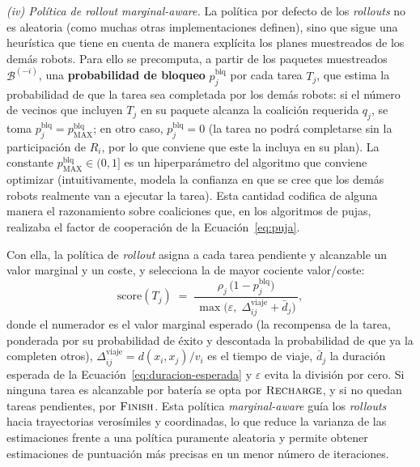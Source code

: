 \smallskip
\emph{(iv) Política de rollout \textit{marginal-aware}.}
La política por defecto de los \textit{rollouts} no es aleatoria (como muchas otras implementaciones definen), sino que sigue una heurística que tiene en cuenta de manera explícita los planes muestreados de los demás robots. Para ello se precomputa, a partir de los paquetes muestreados $\mathcal{B}^{(-i)}$, una \textbf{probabilidad de bloqueo} $p^{\mathrm{blq}}_j$ por cada tarea $T_j$, que estima la probabilidad de que la tarea sea completada por los demás robots: si el número de vecinos que incluyen $T_j$ en su paquete alcanza la coalición requerida $q_j$, se toma $p^{\mathrm{blq}}_j= p^{\mathrm{blq}}_{\mathrm{MAX}}$; en otro caso, $p^{\mathrm{blq}}_j=0$ (la tarea no podrá completarse sin la participación de $R_i$, por lo que conviene que este la incluya en su plan). La constante $p^{\mathrm{blq}}_{\mathrm{MAX}} \in (0,1]$ es un hiperparámetro del algoritmo que conviene optimizar (intuitivamente, modela la confianza en que se cree que los demás robots realmente van a ejecutar la tarea). Esta cantidad codifica de alguna manera el razonamiento sobre coaliciones que, en los algoritmos de pujas, realizaba el factor de cooperación de la Ecuación~\eqref{eq:puja}.

Con ella, la política de \textit{rollout} asigna a cada tarea pendiente y alcanzable un valor marginal y un coste, y selecciona la de mayor cociente valor/coste:
\begin{equation} \label{eq:rollout-score}
    \mathrm{score}(T_j) \;=\; \frac{\,\rho_j\,\bigl(1-p^{\mathrm{blq}}_j\bigr)\,}{\,\max\bigl(\varepsilon,\;\Delta^{\mathrm{viaje}}_{ij}+\bar{d}_j\bigr)\,},
\end{equation}
donde el numerador es el valor marginal esperado (la recompensa de la tarea, ponderada por su probabilidad de éxito y descontada la probabilidad de que ya la completen otros), $\Delta^{\mathrm{viaje}}_{ij}=d(x_i,x_j)/v_i$ es el tiempo de viaje, $\bar{d}_j$ la duración esperada de la Ecuación~\eqref{eq:duracion-esperada} y $\varepsilon$ evita la división por cero. Si ninguna tarea es alcanzable por batería se opta por $\textsc{Recharge}$, y si no quedan tareas pendientes, por $\textsc{Finish}$. Esta política \emph{marginal-aware} guía los \textit{rollouts} hacia trayectorias verosímiles y coordinadas, lo que reduce la varianza de las estimaciones frente a una política puramente aleatoria y permite obtener estimaciones de puntuación más precisas en un menor número de iteraciones.

